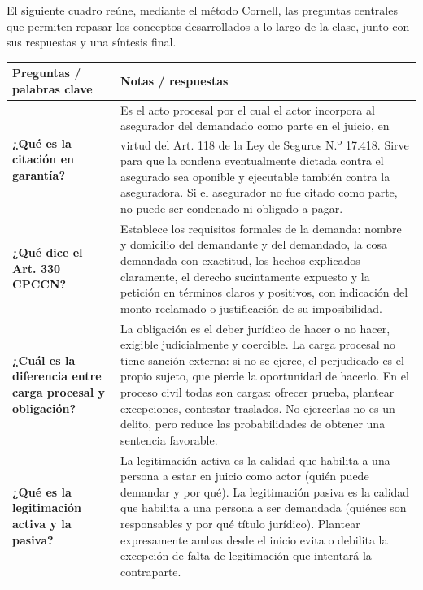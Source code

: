 \documentclass[12pt,oneside]{book}
\begin{document}
El siguiente cuadro reúne, mediante el método Cornell, las preguntas centrales que permiten repasar los conceptos desarrollados a lo largo de la clase, junto con sus respuestas y una síntesis final.

\begin{table}[H]
\centering
\begin{tabularx}{\textwidth}{
    >{\raggedright\arraybackslash}p{}
    >{\raggedright\arraybackslash}X
}
\toprule
\textbf{Preguntas / palabras clave} &
\textbf{Notas / respuestas} \\
\midrule

\textbf{¿Qué es la citación en garantía?} &
Es el acto procesal por el cual el actor incorpora al asegurador del demandado como parte en el juicio, en virtud del Art. 118 de la Ley de Seguros N.\textsuperscript{o} 17.418. Sirve para que la condena eventualmente dictada contra el asegurado sea oponible y ejecutable también contra la aseguradora. Si el asegurador no fue citado como parte, no puede ser condenado ni obligado a pagar. \\

\textbf{¿Qué dice el Art. 330 CPCCN?} &
Establece los requisitos formales de la demanda: nombre y domicilio del demandante y del demandado, la cosa demandada con exactitud, los hechos explicados claramente, el derecho sucintamente expuesto y la petición en términos claros y positivos, con indicación del monto reclamado o justificación de su imposibilidad. \\

\textbf{¿Cuál es la diferencia entre carga procesal y obligación?} &
La obligación es el deber jurídico de hacer o no hacer, exigible judicialmente y coercible. La carga procesal no tiene sanción externa: si no se ejerce, el perjudicado es el propio sujeto, que pierde la oportunidad de hacerlo. En el proceso civil todas son cargas: ofrecer prueba, plantear excepciones, contestar traslados. No ejercerlas no es un delito, pero reduce las probabilidades de obtener una sentencia favorable. \\

\textbf{¿Qué es la legitimación activa y la pasiva?} &
La legitimación activa es la calidad que habilita a una persona a estar en juicio como actor (quién puede demandar y por qué). La legitimación pasiva es la calidad que habilita a una persona a ser demandada (quiénes son responsables y por qué título jurídico). Plantear expresamente ambas desde el inicio evita o debilita la excepción de falta de legitimación que intentará la contraparte. \\


\end{tabularx}
\end{table}
\end{document}
